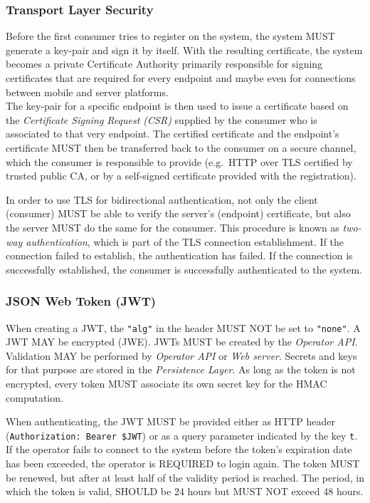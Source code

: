 \documentclass[12pt,english,a4paper,titlepage,cleardoublepage=empty,dottedtoc]{report}
\begin{document}
\subsubsection{Transport Layer Security}\label{transport-layer-security}

Before the first consumer tries to register on the system, the system
MUST generate a key-pair and sign it by itself. With the resulting
certificate, the system becomes a private Certificate Authority
primarily responsible for signing certificates that are required for
every endpoint and maybe even for connections between mobile and server
platforms.\\
The key-pair for a specific endpoint is then used to issue a certificate
based on the \emph{Certificate Signing Request (CSR)} supplied by the
consumer who is associated to that very endpoint. The certified
certificate and the endpoint's certificate MUST then be transferred back
to the consumer on a secure channel, which the consumer is responsible
to provide (e.g.~HTTP over TLS certified by trusted public CA, or by a
self-signed certificate provided with the registration).

In order to use TLS for bidirectional authentication, not only the
client (consumer) MUST be able to verify the server's (endpoint)
certificate, but also the server MUST do the same for the consumer. This
procedure is known as \emph{two-way authentication}, which is part of
the TLS connection establishment. If the connection failed to establish,
the authentication has failed. If the connection is successfully
established, the consumer is successfully authenticated to the system.

\subsubsection{JSON Web Token (JWT)}\label{json-web-token-jwt}

When creating a JWT, the \texttt{"alg"} in the header MUST NOT be set to
\texttt{"none"}. A JWT MAY be encrypted (JWE). JWTs MUST be created by
the \emph{Operator API}. Validation MAY be performed by \emph{Operator
API} or \emph{Web server}. Secrets and keys for that purpose are stored
in the \emph{Persistence Layer}. As long as the token is not encrypted,
every token MUST associate its own secret key for the HMAC computation.

When authenticating, the JWT MUST be provided either as HTTP header
(\texttt{Authorization:\ Bearer\ \$JWT}) or as a query parameter
indicated by the key \texttt{t}. If the operator fails to connect to the
system before the token's expiration date has been exceeded, the
operator is REQUIRED to login again. The token MUST be renewed, but
after at least half of the validity period is reached. The period, in
which the token is valid, SHOULD be 24 hours but MUST NOT exceed 48
hours.
\end{document}

